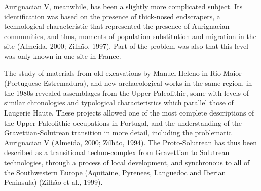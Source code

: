 \documentclass[12pt,twoside]{reedthesis}
\begin{document}
Aurignacian V, meanwhile, has been a slightly more complicated subject. Its identification was based on the presence of thick-nosed endscrapers, a technological characteristic that represented the presence of Aurignacian communities, and thus, moments of population substitution and migration in the site (Almeida, 2000; Zilhão, 1997). Part of the problem was also that this level was only known in one site in France.

The study of materials from old excavations by Manuel Heleno in Rio Maior (Portuguese Estremadura), and new archaeological works in the same region, in the 1980s revealed assemblages from the Upper Paleolithic, some with levels of similar chronologies and typological characteristics which parallel those of Laugerie Haute. These projects allowed one of the most complete descriptions of the Upper Paleolithic occupations in Portugal, and the understanding of the Gravettian-Solutrean transition in more detail, including the problematic Aurignacian V (Almeida, 2000; Zilhão, 1994).
The Proto-Solutrean has thus been described as a transitional techno-complex from Gravettian to Solutrean technologies, through a process of local development, and synchronous to all of the Southwestern Europe (Aquitaine, Pyrenees, Languedoc and Iberian Peninsula) (Zilhão et al., 1999).
\end{document}
